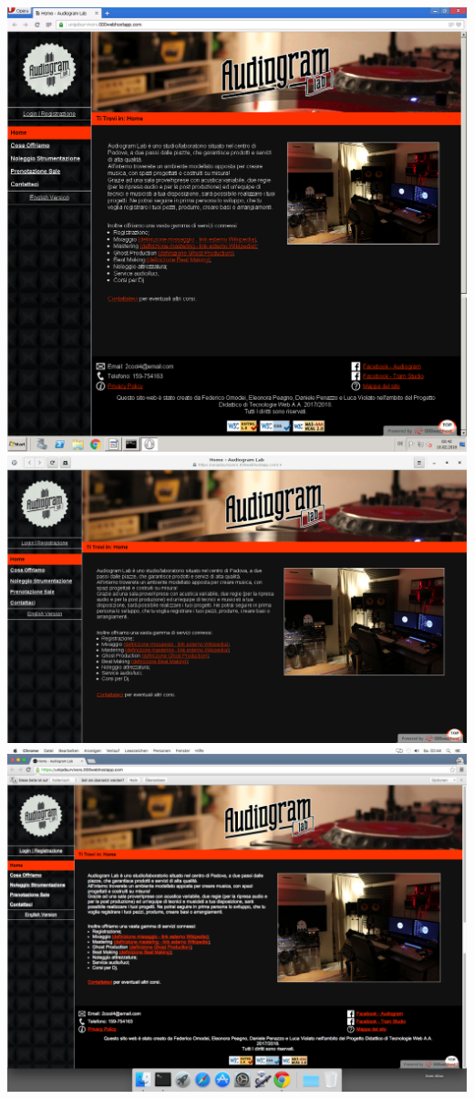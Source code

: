 \begin{center}
\vfill
\includegraphics[scale=0.25]{Images/Opera15Windows.png}
\vfill
\includegraphics[scale=0.25]{Images/Epiphany3Debian.png}
\vfill
\includegraphics[scale=2.5]{Images/Chrome48MacOSX.png}

\end{center}
